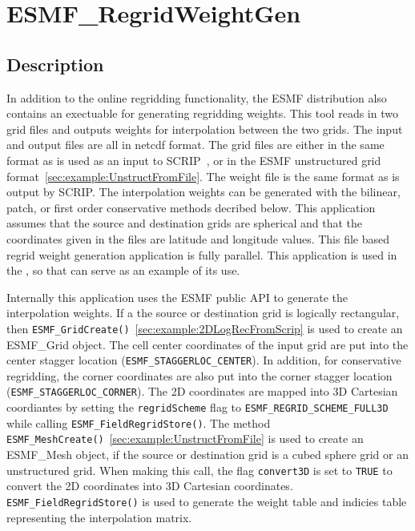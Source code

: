 
\section{ESMF\_RegridWeightGen}
\label{sec:ESMF_RegridWeightGen}

\subsection{Description}

 In addition to the online regridding functionality, the ESMF distribution also 
contains an exectuable for generating regridding weights. This tool reads in
two grid files and outputs weights for interpolation
between the two grids. The input and output files are all in netcdf format. The grid files are either in 
the same format as is used as an input to SCRIP~\cite{ref:SCRIP}, or in the ESMF unstructured grid format~\ref{sec:example:UnstructFromFile}. The weight file is the same format as is output by SCRIP. The interpolation weights can be generated with
the bilinear, patch, or first order conservative methods decribed below. This application assumes that the
source and destination grids are spherical and that the coordinates given in the files are latitude and longitude
values. This file based regrid weight generation application is fully parallel. This application is used in the 
, so that can serve as an example of its use.

Internally this application uses the ESMF public API to generate the interpolation weights.
If a the source or destination grid is logically rectangular, then {\tt ESMF\_GridCreate()}~\ref{sec:example:2DLogRecFromScrip} is used to create an ESMF\_Grid object. The cell center 
coordinates of the input grid are put into the center stagger location ({\tt ESMF\_STAGGERLOC\_CENTER}). In addition, for conservative regridding, the corner coordinates are also put into the corner stagger location 
({\tt ESMF\_STAGGERLOC\_CORNER}). The 2D coordinates are mapped
into 3D Cartesian coordiantes by setting the {\tt regridScheme} flag to {\tt ESMF\_REGRID\_SCHEME\_FULL3D} while calling 
{\tt ESMF\_FieldRegridStore()}.   The method
{\tt ESMF\_MeshCreate()}~\ref{sec:example:UnstructFromFile} is used to create an ESMF\_Mesh object, if the 
source or destination grid is a cubed sphere grid or an unstructured grid. When making this call, 
the flag {\tt convert3D} is set to {\tt TRUE} to convert the 2D coordinates into 3D Cartesian coordinates.
{\tt ESMF\_FieldRegridStore()} is used to generate the weight table and indicies table representing the interpolation matrix. 

